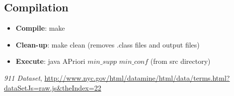 \documentclass[11pt]{article}
\begin{document}
\subsection* {Compilation}
\begin{itemize}
\item \textbf{Compile}: make
\item \textbf{Clean-up}: make clean (removes .class files and output files)
\item\textbf{Execute}: java APriori  $min\_supp$ $min\_conf$ (from src directory)

\end{itemize}


\begin{thebibliography}{50}
 \textit{911 Dataset}, \url{http://www.nyc.gov/html/datamine/html/data/terms.html?dataSetJs=raw.js&theIndex=22}
\end{thebibliography}
\end{document}

